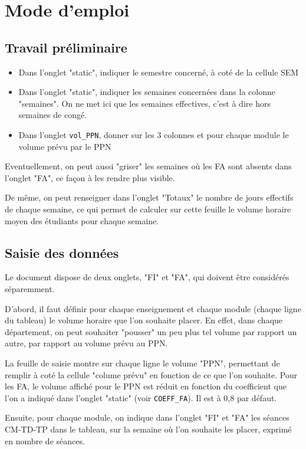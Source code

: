 \documentclass[12pt,a4paper]{article}
\begin{document}
\section{Mode d'emploi}

\subsection{Travail préliminaire}
\begin{itemize}
\item Dans l'onglet "static", indiquer le semestre concerné, à coté de la cellule SEM
\item Dans l'onglet "static", indiquer les semaines concernées dans la colonne "semaines".
On ne met ici que les semaines effectives, c'est à dire hors semaines de congé.

\item Dans l'onglet {\tt vol\_PPN}, donner sur les 3 colonnes et pour chaque module le volume prévu par le PPN
\end{itemize}

Eventuellement, on peut aussi "griser" les semaines où les FA sont absents dans l'onglet "FA", ce façon à les rendre plus visible.

De même, on peut renseigner dans l'onglet "Totaux" le nombre de jours effectifs de chaque semaine, ce qui permet de calculer sur cette feuille le volume horaire moyen des étudiants pour chaque semaine.


\subsection{Saisie des données}

Le document dispose de deux onglets, "FI" et "FA", qui doivent être considérés séparemment.

D'abord, il faut définir pour chaque enseignement et chaque module (chaque ligne du tableau) le volume horaire que l'on souhaite placer.
En effet, dans chaque département, on peut souhaiter "pousser" un peu plus tel volume par rapport un autre, par rapport au volume prévu au PPN.

La feuille de saisie montre sur chaque ligne le volume "PPN", permettant de remplir à coté la cellule "colume prévu" en fonction de ce que l'on souhaite.
Pour les FA, le volume affiché pour le PPN est réduit en fonction du coefficient que l'on a indiqué dans l'onglet "static"
(voir {\tt COEFF\_FA}).
Il est à 0,8 par défaut.

Ensuite, pour chaque module, on indique dans l'onglet "FI" et "FA" les séances CM-TD-TP dans le tableau, sur la semaine où l'on souhaite les placer, exprimé en nombre de séances.
\end{document}
